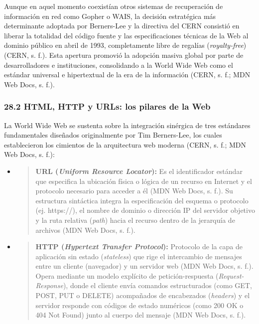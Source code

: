 Aunque en aquel momento coexistían otros sistemas de recuperación de
información en red como Gopher o WAIS, la decisión estratégica más
determinante adoptada por Berners-Lee y la directiva del CERN consistió
en liberar la totalidad del código fuente y las especificaciones
técnicas de la Web al dominio público en abril de 1993, completamente
libre de regalías (\emph{royalty-free}) (CERN, s. f.). Esta apertura
promovió la adopción masiva global por parte de desarrolladores e
instituciones, consolidando a la World Wide Web como el estándar
universal e hipertextual de la era de la información (CERN, s. f.; MDN
Web Docs, s. f.).

\hypertarget{html-http-y-urls-los-pilares-de-la-web}{%
\subsubsection{\texorpdfstring{\textbf{28.2 HTML, HTTP y URLs: los
pilares de la
Web}}{28.2 HTML, HTTP y URLs: los pilares de la Web}}\label{html-http-y-urls-los-pilares-de-la-web}}

La World Wide Web se sustenta sobre la integración sinérgica de tres
estándares fundamentales diseñados originalmente por Tim Berners-Lee,
los cuales establecieron los cimientos de la arquitectura web moderna
(CERN, s. f.; MDN Web Docs, s. f.):

\begin{itemize}
\item
  \begin{quote}
  \textbf{URL (\emph{Uniform Resource Locator}):} Es el identificador
  estándar que especifica la ubicación física o lógica de un recurso en
  Internet y el protocolo necesario para acceder a él (MDN Web Docs, s.
  f.). Su estructura sintáctica integra la especificación del esquema o
  protocolo (ej. https://), el nombre de dominio o dirección IP del
  servidor objetivo y la ruta relativa (\emph{path}) hacia el recurso
  dentro de la jerarquía de archivos (MDN Web Docs, s. f.).
  \end{quote}
\item
  \begin{quote}
  \textbf{HTTP (\emph{Hypertext Transfer Protocol}):} Protocolo de la
  capa de aplicación sin estado (\emph{stateless}) que rige el
  intercambio de mensajes entre un cliente (navegador) y un servidor web
  (MDN Web Docs, s. f.). Opera mediante un modelo explícito de
  petición-respuesta (\emph{Request-Response}), donde el cliente envía
  comandos estructurados (como GET, POST, PUT o DELETE) acompañados de
  encabezados (\emph{headers}) y el servidor responde con códigos de
  estado numéricos (como 200 OK o 404 Not Found) junto al cuerpo del
  mensaje (MDN Web Docs, s. f.).
  \end{quote}
\end{itemize}

